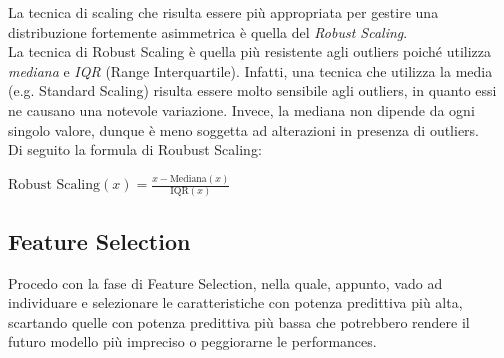 \documentclass[]{article}
\begin{document}
        La tecnica di scaling che risulta essere più appropriata per gestire una distribuzione fortemente asimmetrica è quella del \textit{Robust Scaling}.\\
        La tecnica di Robust Scaling è quella più resistente agli outliers poiché utilizza \textit{mediana} e \textit{IQR} (Range Interquartile). Infatti, una tecnica che utilizza la media (e.g. Standard Scaling) risulta essere molto sensibile agli outliers, in quanto essi ne causano una notevole variazione. Invece, la mediana non dipende da ogni singolo valore, dunque è meno soggetta ad alterazioni in presenza di outliers.\\
        Di seguito la formula di Roubust Scaling:\\
        \begin{center}
            $\text{Robust Scaling}(x) = \frac{x - \text{Mediana}(x)}{\text{IQR}(x)}$
        \end{center}

    \subsection{Feature Selection}
        Procedo con la fase di Feature Selection, nella quale, appunto, vado ad individuare e selezionare le caratteristiche con potenza predittiva più alta, scartando quelle con potenza predittiva più bassa che potrebbero rendere il futuro modello più impreciso o peggiorarne le performances.
\end{document}
